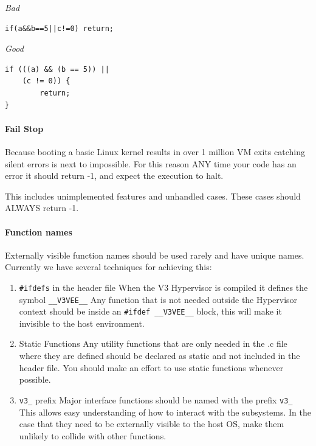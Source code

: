 \documentclass[11pt]{article}
\begin{document}
{\em Bad}
\begin{verbatim}
if(a&&b==5||c!=0) return;
\end{verbatim}


{\em Good}
\begin{verbatim}
if (((a) && (b == 5)) || 
    (c != 0)) {
       	return;
}
\end{verbatim}



\paragraph*{Fail Stop}
Because booting a basic Linux kernel results in over 1 million VM exits
catching silent errors is next to impossible. For this reason
ANY time your code has an error it should return -1, and expect the
execution to halt. 

This includes unimplemented features and unhandled cases. These cases
should ALWAYS return -1. 


\paragraph*{Function names}
Externally visible function names should be used rarely and have
unique names. Currently we have several techniques for achieving this:

\begin{enumerate}
\item \verb.#ifdefs. in the header file
\newline
When the V3 Hypervisor is compiled it defines the symbol
\verb.__V3VEE__. Any function that is not needed outside the Hypervisor
context should be inside an \verb.#ifdef __V3VEE__. block, this will make it
invisible to the host environment.

\item Static Functions
\newline
Any utility functions that are only needed in the .c file where they
are defined should be declared as static and not included in the
header file. You should make an effort to use static functions
whenever possible. 

\item \verb.v3_. prefix \newline Major interface functions should be
  named with the prefix \verb.v3_. This allows easy understanding of
  how to interact with the subsystems.  In the case that they need to
  be externally visible to the host OS, make them unlikely to collide
  with other functions.
\end{enumerate}
\end{document}
